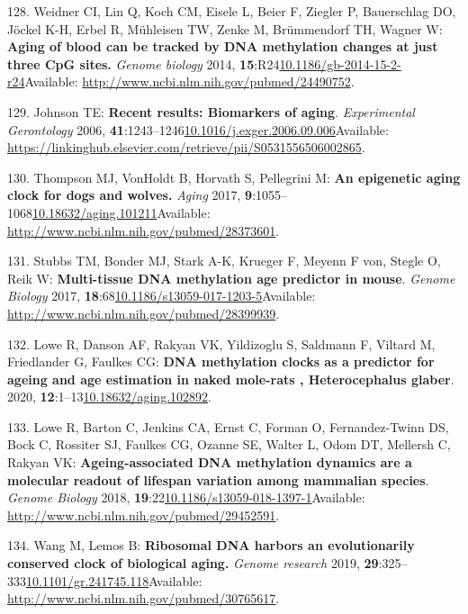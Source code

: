 \documentclass[
]{book}
\begin{document}
\leavevmode\hypertarget{ref-Weidner2014}{}%
128. Weidner CI, Lin Q, Koch CM, Eisele L, Beier F, Ziegler P, Bauerschlag DO, Jöckel K-H, Erbel R, Mühleisen TW, Zenke M, Brümmendorf TH, Wagner W: \textbf{Aging of blood can be tracked by DNA methylation changes at just three CpG sites.} \emph{Genome biology} 2014, \textbf{15}:R24\href{https://doi.org/10.1186/gb-2014-15-2-r24}{10.1186/gb-2014-15-2-r24}Available: \url{http://www.ncbi.nlm.nih.gov/pubmed/24490752}.

\leavevmode\hypertarget{ref-Johnson2006}{}%
129. Johnson TE: \textbf{Recent results: Biomarkers of aging}. \emph{Experimental Gerontology} 2006, \textbf{41}:1243--1246\href{https://doi.org/10.1016/j.exger.2006.09.006}{10.1016/j.exger.2006.09.006}Available: \url{https://linkinghub.elsevier.com/retrieve/pii/S0531556506002865}.

\leavevmode\hypertarget{ref-Thompson2017}{}%
130. Thompson MJ, VonHoldt B, Horvath S, Pellegrini M: \textbf{An epigenetic aging clock for dogs and wolves.} \emph{Aging} 2017, \textbf{9}:1055--1068\href{https://doi.org/10.18632/aging.101211}{10.18632/aging.101211}Available: \url{http://www.ncbi.nlm.nih.gov/pubmed/28373601}.

\leavevmode\hypertarget{ref-Stubbs2017}{}%
131. Stubbs TM, Bonder MJ, Stark A-K, Krueger F, Meyenn F von, Stegle O, Reik W: \textbf{Multi-tissue DNA methylation age predictor in mouse}. \emph{Genome Biology} 2017, \textbf{18}:68\href{https://doi.org/10.1186/s13059-017-1203-5}{10.1186/s13059-017-1203-5}Available: \url{http://www.ncbi.nlm.nih.gov/pubmed/28399939}.

\leavevmode\hypertarget{ref-Lowe2020}{}%
132. Lowe R, Danson AF, Rakyan VK, Yildizoglu S, Saldmann F, Viltard M, Friedlander G, Faulkes CG: \textbf{DNA methylation clocks as a predictor for ageing and age estimation in naked mole-rats , Heterocephalus glaber}. 2020, \textbf{12}:1--13\href{https://doi.org/10.18632/aging.102892}{10.18632/aging.102892}.

\leavevmode\hypertarget{ref-Lowe2018}{}%
133. Lowe R, Barton C, Jenkins CA, Ernst C, Forman O, Fernandez-Twinn DS, Bock C, Rossiter SJ, Faulkes CG, Ozanne SE, Walter L, Odom DT, Mellersh C, Rakyan VK: \textbf{Ageing-associated DNA methylation dynamics are a molecular readout of lifespan variation among mammalian species}. \emph{Genome Biology} 2018, \textbf{19}:22\href{https://doi.org/10.1186/s13059-018-1397-1}{10.1186/s13059-018-1397-1}Available: \url{http://www.ncbi.nlm.nih.gov/pubmed/29452591}.

\leavevmode\hypertarget{ref-Wang2019}{}%
134. Wang M, Lemos B: \textbf{Ribosomal DNA harbors an evolutionarily conserved clock of biological aging.} \emph{Genome research} 2019, \textbf{29}:325--333\href{https://doi.org/10.1101/gr.241745.118}{10.1101/gr.241745.118}Available: \url{http://www.ncbi.nlm.nih.gov/pubmed/30765617}.
\end{document}
